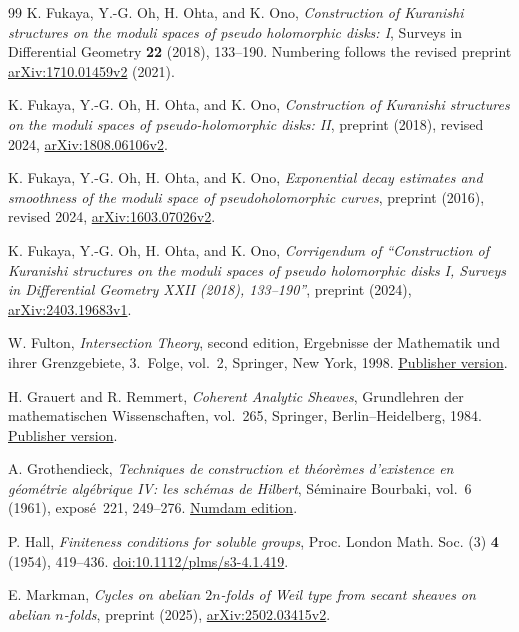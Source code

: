\documentclass[11pt]{article}
\theoremstyle{definition}
\theoremstyle{remark}
\numberwithin{equation}{section}
\begin{document}
\begin{thebibliography}{99}
K. Fukaya, Y.-G. Oh, H. Ohta, and K. Ono,
\emph{Construction of Kuranishi structures on the moduli spaces of
pseudo holomorphic disks: I},
Surveys in Differential Geometry \textbf{22} (2018), 133--190.
Numbering follows the revised preprint
\href{https://arxiv.org/abs/1710.01459v2}{arXiv:1710.01459v2} (2021).

K. Fukaya, Y.-G. Oh, H. Ohta, and K. Ono,
\emph{Construction of Kuranishi structures on the moduli spaces of
pseudo-holomorphic disks: II},
preprint (2018), revised 2024,
\href{https://arxiv.org/abs/1808.06106v2}{arXiv:1808.06106v2}.

K. Fukaya, Y.-G. Oh, H. Ohta, and K. Ono,
\emph{Exponential decay estimates and smoothness of the moduli space
of pseudoholomorphic curves},
preprint (2016), revised 2024,
\href{https://arxiv.org/abs/1603.07026v2}{arXiv:1603.07026v2}.

K. Fukaya, Y.-G. Oh, H. Ohta, and K. Ono,
\emph{Corrigendum of ``Construction of Kuranishi structures on the
moduli spaces of pseudo holomorphic disks I, Surveys in Differential
Geometry XXII (2018), 133--190''},
preprint (2024), \href{https://arxiv.org/abs/2403.19683v1}{arXiv:2403.19683v1}.

W. Fulton,
\emph{Intersection Theory}, second edition,
Ergebnisse der Mathematik und ihrer Grenzgebiete, 3.~Folge, vol.~2,
Springer, New York, 1998.
\href{https://doi.org/10.1007/978-1-4612-1700-8}{Publisher version}.

H. Grauert and R. Remmert,
\emph{Coherent Analytic Sheaves},
Grundlehren der mathematischen Wissenschaften, vol.~265,
Springer, Berlin--Heidelberg, 1984.
\href{https://doi.org/10.1007/978-3-642-69582-7}{Publisher version}.

A. Grothendieck,
\emph{Techniques de construction et th\'eor\`emes d'existence en
g\'eom\'etrie alg\'ebrique IV: les sch\'emas de Hilbert},
S\'eminaire Bourbaki, vol.~6 (1961), expos\'e~221, 249--276.
\href{https://numdam.org/item/SB_1960-1961__6__249_0/}{Numdam edition}.

P. Hall,
\emph{Finiteness conditions for soluble groups},
Proc. London Math. Soc. (3) \textbf{4} (1954), 419--436.
\href{https://doi.org/10.1112/plms/s3-4.1.419}{doi:10.1112/plms/s3-4.1.419}.

E. Markman,
\emph{Cycles on abelian $2n$-folds of Weil type from secant sheaves
on abelian $n$-folds},
preprint (2025), \href{https://arxiv.org/abs/2502.03415v2}{arXiv:2502.03415v2}.


\end{thebibliography}
\end{document}
